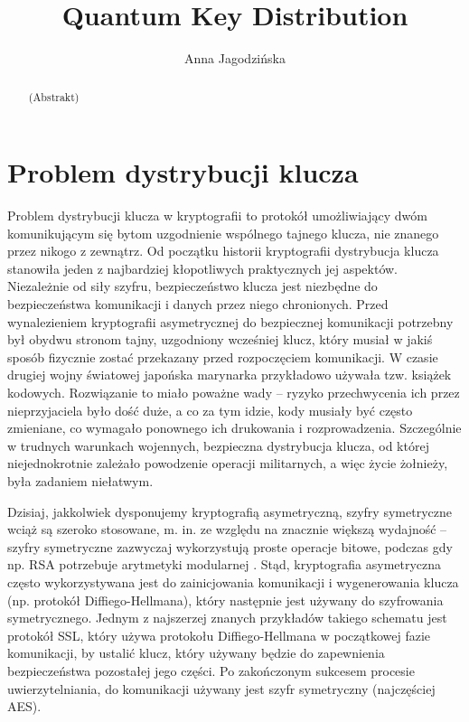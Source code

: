 \documentclass[10pt]{article}
\begin{document}
\begin{opening}

\title{Quantum Key Distribution}
\author[AGH University of Science and Technology, anna.jagodzinska91@gmail.com]{Anna Jagodzińska}

\begin{abstract}
  (Abstrakt)
\end{abstract}


\end{opening}

\section{Problem dystrybucji klucza}

Problem dystrybucji klucza w kryptografii to protokół umożliwiający dwóm komunikującym się bytom
uzgodnienie wspólnego tajnego klucza, nie znanego przez nikogo z zewnątrz. Od początku historii
kryptografii dystrybucja klucza stanowiła jeden z najbardziej kłopotliwych praktycznych jej aspektów.
Niezależnie od siły szyfru, bezpieczeństwo klucza jest niezbędne do bezpieczeństwa komunikacji i danych
przez niego chronionych. Przed wynalezieniem kryptografii asymetrycznej do bezpiecznej komunikacji 
potrzebny był obydwu stronom tajny, uzgodniony wcześniej klucz, który musiał w jakiś sposób fizycznie 
zostać przekazany przed rozpoczęciem komunikacji. W czasie drugiej wojny światowej japońska marynarka
przykładowo używała tzw. książek kodowych. Rozwiązanie to miało poważne wady -- ryzyko przechwycenia
ich przez nieprzyjaciela było dość duże, a co za tym idzie, kody musiały być często zmieniane, co 
wymagało ponownego ich drukowania i rozprowadzenia. Szczególnie w trudnych warunkach wojennych,
bezpieczna dystrybucja klucza, od której niejednokrotnie zależało powodzenie operacji militarnych,
a więc życie żołnieży, była zadaniem niełatwym. 

Dzisiaj, jakkolwiek dysponujemy kryptografią asymetryczną, szyfry symetryczne wciąż są szeroko 
stosowane, m. in. ze względu na znacznie większą wydajność \cite{IntelAES, IntelSSL} -- szyfry 
symetryczne zazwyczaj wykorzystują proste operacje bitowe, podczas gdy np. RSA potrzebuje arytmetyki
modularnej \footnotemark. Stąd, kryptografia asymetryczna często wykorzystywana jest do zainicjowania
komunikacji i wygenerowania klucza (np. protokół Diffiego-Hellmana), który następnie jest używany do
szyfrowania symetrycznego. Jednym z najszerzej znanych przykładów takiego schematu jest protokół
SSL, który używa protokołu Diffiego-Hellmana w początkowej fazie komunikacji, by ustalić klucz,
który używany będzie do zapewnienia bezpieczeństwa pozostałej jego części. Po zakończonym sukcesem
procesie uwierzytelniania, do komunikacji używany jest szyfr symetryczny (najczęściej AES).




\nocite{*}



\end{document}
